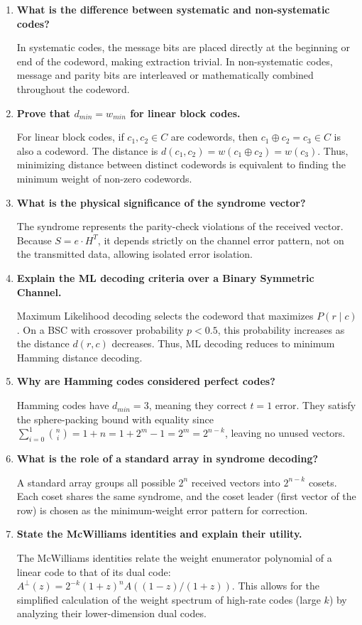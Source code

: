 \documentclass[12pt,a4paper]{article}
\newcommand{\Q}[1]{\textbf{#1}\par\noindent\ignorespaces}
\begin{document}
\begin{tcolorbox}[exambox, title={\textbf{Frequently Asked / Viva Questions}}]
\begin{enumerate}[topsep=0pt, label=\textbf{Q\arabic*.}, itemsep=5pt]
  \item \Q{What is the difference between systematic and non-systematic codes?}
    In systematic codes, the message bits are placed directly at the beginning or end of the codeword, making extraction trivial. In non-systematic codes, message and parity bits are interleaved or mathematically combined throughout the codeword.
  \item \Q{Prove that $d_{min} = w_{min}$ for linear block codes.}
    For linear block codes, if $c_1, c_2 \in C$ are codewords, then $c_1 \oplus c_2 = c_3 \in C$ is also a codeword. The distance is $d(c_1, c_2) = w(c_1 \oplus c_2) = w(c_3)$. Thus, minimizing distance between distinct codewords is equivalent to finding the minimum weight of non-zero codewords.
  \item \Q{What is the physical significance of the syndrome vector?}
    The syndrome represents the parity-check violations of the received vector. Because $S = e \cdot H^T$, it depends strictly on the channel error pattern, not on the transmitted data, allowing isolated error isolation.
  \item \Q{Explain the ML decoding criteria over a Binary Symmetric Channel.}
    Maximum Likelihood decoding selects the codeword that maximizes $P(r \mid c)$. On a BSC with crossover probability $p < 0.5$, this probability increases as the distance $d(r, c)$ decreases. Thus, ML decoding reduces to minimum Hamming distance decoding.
  \item \Q{Why are Hamming codes considered perfect codes?}
    Hamming codes have $d_{min}=3$, meaning they correct $t=1$ error. They satisfy the sphere-packing bound with equality since $\sum_{i=0}^1 \binom{n}{i} = 1 + n = 1 + 2^m - 1 = 2^m = 2^{n-k}$, leaving no unused vectors.
  \item \Q{What is the role of a standard array in syndrome decoding?}
    A standard array groups all possible $2^n$ received vectors into $2^{n-k}$ cosets. Each coset shares the same syndrome, and the coset leader (first vector of the row) is chosen as the minimum-weight error pattern for correction.
  \item \Q{State the McWilliams identities and explain their utility.}
    The McWilliams identities relate the weight enumerator polynomial of a linear code to that of its dual code: $A^\perp(z) = 2^{-k}(1+z)^n A((1-z)/(1+z))$. This allows for the simplified calculation of the weight spectrum of high-rate codes (large $k$) by analyzing their lower-dimension dual codes.

\end{enumerate}
\end{tcolorbox}
\end{document}
